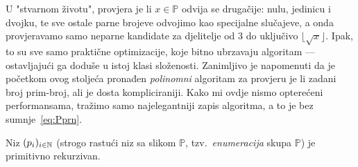 U "stvarnom životu", provjera je li $x\in\mathbb P$ odvija se drugačije: nulu, jedinicu i dvojku, te sve ostale parne brojeve odvojimo kao specijalne slučajeve, a onda provjeravamo samo neparne kandidate za djelitelje od 3 do uključivo $\lfloor\sqrt{x}\rfloor$. Ipak, to su sve samo praktične optimizacije, koje bitno ubrzavaju algoritam --- ostavljajući ga doduše u istoj klasi složenosti. Zanimljivo je napomenuti da je početkom ovog stoljeća pronađen \emph{polinomni} algoritam za provjeru je li zadani broj prim-broj, ali je dosta kompliciraniji. Kako mi ovdje nismo opterećeni performansama, tražimo samo najelegantniji zapis algoritma, a to je bez sumnje~\eqref{eq:Pprn}.

\begin{propozicija}\label{pp:primeprn}
    Niz $(p_i)_{i\in{\mathbb N}}$ (strogo rastući niz sa slikom $\mathbb P$, tzv.\ \emph{enumeracija} skupa $\mathbb P$) je primitivno rekurzivan.
\end{propozicija}
